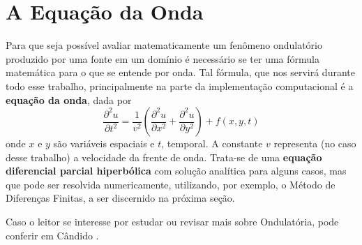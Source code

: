 \section{A Equação da Onda}

	Para que seja possível avaliar matematicamente um fenômeno ondulatório 
	produzido por uma fonte em um domínio é necessário se ter uma fórmula 
	matemática para o que se entende por onda. Tal fórmula, que nos servirá 
	durante todo esse trabalho, principalmente na parte da implementação 
	computacional é a \textbf{equação da onda}, dada por 
	\begin{equation}
		\label{eq:waveEq}
		\dfrac{\partial^2 u}{\partial t^2} = 
			\dfrac{1}{v^2}
			\left(\dfrac{\partial^2 u}{\partial x^2} + 
			\dfrac{\partial^2 u}{\partial y^2}\right) + f(x, y, t)
	\end{equation}
	onde $x$ e $y$ são variáveis espaciais e $t$, temporal. A constante $v$ 
	representa (no caso desse trabalho) a velocidade da frente de onda. Trata-se de uma 
	\textbf{equação diferencial parcial hiperbólica} com solução analítica para alguns casos, mas que pode ser resolvida numericamente, utilizando, por exemplo, o 
	Método de Diferenças Finitas, a ser discernido na próxima seção.
	
	Caso o leitor se interesse por estudar ou revisar mais sobre Ondulatória, pode 
	conferir em Cândido \cite{mfcandido2018}.
